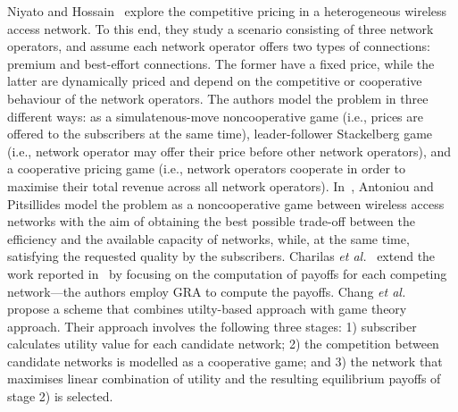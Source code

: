 Niyato and Hossain~\cite{NiyatoHossain2008} explore the competitive pricing in a heterogeneous wireless access network. To this end, they study a scenario consisting of three network operators, and assume each network operator offers two types of connections: premium and best-effort connections. The former have a fixed price, while the latter are dynamically priced and depend on the competitive or cooperative behaviour of the network operators. The authors model the problem in three different ways: as a simulatenous-move noncooperative game (i.e., prices are offered to the subscribers at the same time), leader-follower Stackelberg game (i.e., network operator may offer their price before other network operators), and a cooperative pricing game (i.e., network operators cooperate in order to maximise their total revenue across all network operators). In~\cite{Antoniou07}, Antoniou and Pitsillides model the problem as a noncooperative game between wireless access networks with the aim of obtaining the best possible trade-off between the efficiency and the available capacity of networks, while, at the same time, satisfying the requested quality by the subscribers. Charilas \emph{et al.}~\cite{Charilas08,Charilas2009} extend the work reported in~\cite{Antoniou07} by focusing on the computation of payoffs for each competing network---the authors employ GRA to compute the payoffs. Chang \emph{et al.}~\cite{Chang09} propose a scheme that combines utilty-based approach with game theory approach. Their approach involves the following three stages: 1) subscriber calculates utility value for each candidate network; 2) the competition between candidate networks is modelled as a cooperative game; and 3) the network that maximises linear combination of utility and the resulting equilibrium payoffs of stage 2) is selected.


